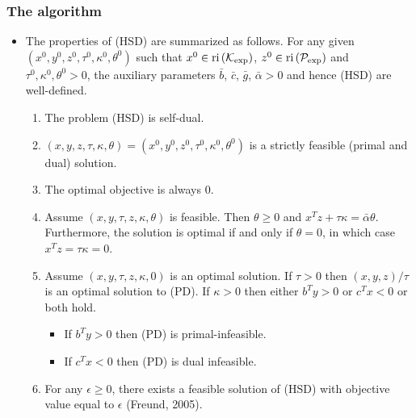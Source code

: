 \documentclass{beamer}
\def\interior{\protect{\textnormal{ri}}}
\begin{document}
\begin{frame}
	\frametitle{The algorithm}
	\begin{itemize}
		\item The properties of (HSD) are summarized as follows.
			For any given $(x^0, y^0, z^0, \tau^0, \kappa^0, \theta^0)$ such that $x^0 \in \interior \left(\mathcal{K}_{\exp}\right)$, $z^0 \in \interior \left(\mathcal{P}_{\exp}\right)$ and $\tau^0, \kappa^0, \theta^0 > 0$, the auxiliary parameters $\bar{b}$, $\bar{c}$, $\bar{g}$, $\bar{\alpha}>0$ and hence (HSD) are well-defined.
			\begin{enumerate}
				\item The problem (HSD) is \textnormal{self-dual}.
				\item $(x,y,z,\tau,\kappa, \theta) = (x^0,y^0,z^0, \tau^0,\kappa^0, \theta^0)$ is a strictly feasible (primal and dual) solution.
				\item The optimal objective is always 0. 
				\item Assume $(x,y, \tau, z,\kappa, \theta)$ is feasible. Then $\theta\geq 0$ and $x^T z + \tau \kappa = \bar{\alpha} \theta$. Furthermore, the solution is optimal if and only if $\theta=0$, in which case $x^T z = \tau\kappa = 0$.
				\item Assume $(x,y, \tau, z,\kappa, 0)$ is an optimal solution. If $\tau>0$ then $(x,y,z)/\tau$ is an optimal solution to (PD). If $\kappa>0$ then either $b^Ty>0$ or $c^Tx<0$ or both hold. 
				\begin{itemize}
					\item If $b^T y>0$ then (PD) is primal-infeasible.
					\item If $c^T x < 0$ then (PD) is dual infeasible.
				\end{itemize}
				\item For any $\epsilon \geq 0$, there exists a feasible solution of (HSD) with objective value equal to $\epsilon$ (Freund, 2005).
			\end{enumerate}
	\end{itemize}
\end{frame}
\end{document}
